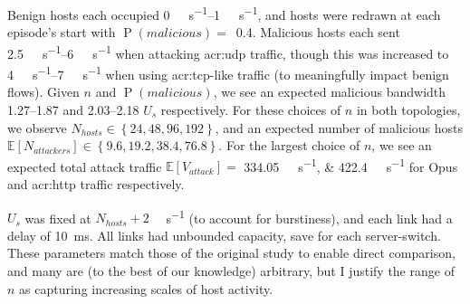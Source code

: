 Benign hosts each occupied \qtyrange{0}{1}{\mega\bit\per\second}, and hosts were redrawn at each episode's start with $\operatorname{P}(\mathit{malicious})=$~\num{0.4}.
Malicious hosts each sent \qtyrange{2.5}{6}{\mega\bit\per\second} when attacking \gls{acr:udp} traffic, though this was increased to \qtyrange{4}{7}{\mega\bit\per\second} when using \gls{acr:tcp}-like traffic (to meaningfully impact benign flows).
Given $n$ and $\operatorname{P}(\mathit{malicious})$, we see an expected malicious bandwidth \numrange{1.27}{1.87} and \qtyrange{2.03}{2.18}{\times} $U_s$ respectively.
For these choices of $n$ in both topologies, we observe $N_{\mathit{hosts}} \in \left\{24, 48, 96, 192\right\}$, and an expected number of malicious hosts $\mathbb{E}\left[N_{\mathit{attackers}}\right] \in \left\{9.6, 19.2, 38.4, 76.8\right\}$.
For the largest choice of $n$, we see an expected total attack traffic $\mathbb{E}\left[V_{\mathit{attack}}\right] =$ \qtylist{334.05;422.4}{\mega\bit\per\second} for Opus and \gls{acr:http} traffic respectively.

$U_s$ was fixed at $N_{\mathit{hosts}}+2$ \unit{\mega\bit\per\second} (to account for burstiness), and each link had a delay of \qty{10}{\milli\second}.
All links had unbounded capacity, save for each server-switch.
These parameters match those of the original study to enable direct comparison, and many are (to the best of our knowledge) arbitrary, but I justify the range of $n$ as capturing increasing scales of host activity.